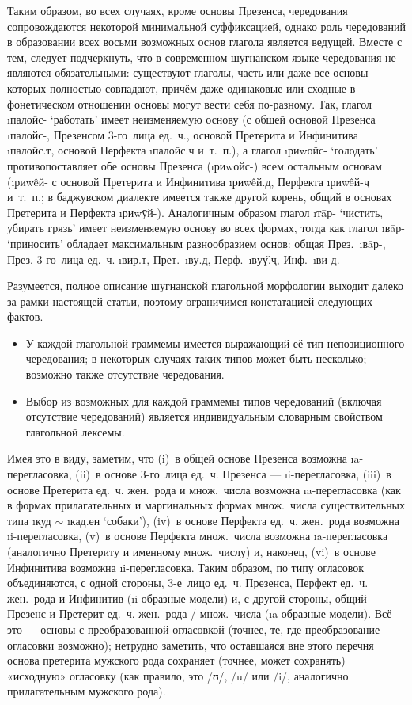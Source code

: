 Таким образом, во всех случаях, кроме основы Презенса, чередования сопровождаются некоторой минимальной суффиксацией, однако роль чередований в образовании всех восьми возможных основ глагола является ведущей. Вместе с тем, следует подчеркнуть, что в современном шугнанском языке чередования не являются обязательными: существуют глаголы, часть или даже все основы которых полностью совпадают, причём даже одинаковые или сходные в фонетическом отношении основы могут вести себя по-разному. Так, глагол \i{палойс}- ‘работать’ имеет неизменяемую основу (с общей основой Презенса \i{палойс}-, Презенсом 3-го~лица ед.~ч., основой Претерита и Инфинитива \i{палойс.т}, основой Перфекта \i{палойс.ч} и~т.~п.), а глагол \i{риwойс}- ‘голодать’ противопоставляет обе основы Презенса (\i{риwойс}-) всем остальным основам (\i{риwêй}- с основой Претерита и Инфинитива \i{риwêй.д}, Перфекта \i{риwêй-ҷ} и~т.~п.; в баджувском диалекте имеется также другой корень, общий в основах Претерита и Перфекта \i{риwӯй}-). Аналогичным образом глагол \i{тāр}- ‘чистить, убирать грязь’ имеет неизменяемую основу во всех формах, тогда как глагол \i{вāр}- ‘приносить’ обладает максимальным разнообразием основ: общая През.~\i{вāр}-, През. 3-го~лица ед.~ч. \i{вӣр.т}, Прет.~\i{вӯ.д}, Перф.~\i{вӯɣ̌.ҷ}, Инф.~\i{вӣ-д}.

Разумеется, полное описание шугнанской глагольной морфологии выходит далеко за рамки настоящей статьи, поэтому ограничимся констатацией следующих фактов.

\begin{itemize}
	\item{У каждой глагольной граммемы имеется выражающий её тип непозиционного чередования; в некоторых случаях таких типов может быть несколько; возможно также отсутствие чередования.}
	\item{Выбор из возможных для каждой граммемы типов чередований (включая отсутствие чередований) является индивидуальным словарным свойством глагольной лексемы.}
\end{itemize}

Имея это в виду, заметим, что (i)~в общей основе Презенса возможна \i{a}-перегласовка, (ii)~в основе 3-го~лица ед.~ч. Презенса — \i{i}-перегласовка, (iii)~в основе Претерита ед.~ч. жен.~рода и множ.~числа возможна \i{a}-перегласовка (как в формах прилагательных и маргинальных формах множ.~числа существительных типа \i{куд} $\sim$ \i{кад.ен} ‘собаки’), (iv)~в основе Перфекта ед.~ч. жен.~рода возможна \i{i}-перегласовка, (v)~в основе Перфекта множ.~числа возможна \i{a}-перегласовка (аналогично Претериту и именному множ.~числу) и, наконец, (vi)~в основе Инфинитива возможна \i{i}-перегласовка. Таким образом, по типу огласовок объединяются, с одной стороны, 3-е~лицо ед.~ч. Презенса, Перфект ед.~ч. жен.~рода и Инфинитив (\i{i}-образные модели) и, с другой стороны, общий Презенс и Претерит ед.~ч. жен.~рода / множ.~числа (\i{a}-образные модели). Всё это — основы с преобразованной огласовкой (точнее, те, где преобразование огласовки возможно); нетрудно заметить, что оставшаяся вне этого перечня основа претерита мужского рода сохраняет (точнее, может сохранять) «исходную» огласовку (как правило, это /ʊ/, /u/ или /i/, аналогично прилагательным мужского рода).

